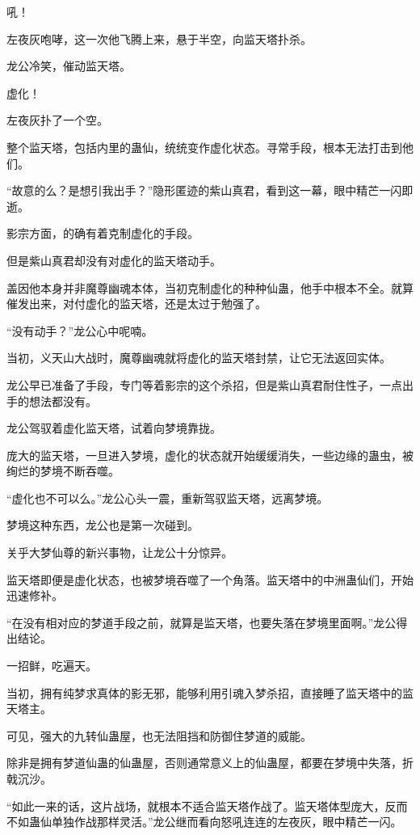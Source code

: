 
\begin{this_body}

吼！

左夜灰咆哮，这一次他飞腾上来，悬于半空，向监天塔扑杀。

龙公冷笑，催动监天塔。

虚化！

左夜灰扑了一个空。

整个监天塔，包括内里的蛊仙，统统变作虚化状态。寻常手段，根本无法打击到他们。

“故意的么？是想引我出手？”隐形匿迹的紫山真君，看到这一幕，眼中精芒一闪即逝。

影宗方面，的确有着克制虚化的手段。

但是紫山真君却没有对虚化的监天塔动手。

盖因他本身并非魔尊幽魂本体，当初克制虚化的种种仙蛊，他手中根本不全。就算催发出来，对付虚化的监天塔，还是太过于勉强了。

“没有动手？”龙公心中呢喃。

当初，义天山大战时，魔尊幽魂就将虚化的监天塔封禁，让它无法返回实体。

龙公早已准备了手段，专门等着影宗的这个杀招，但是紫山真君耐住性子，一点出手的想法都没有。

龙公驾驭着虚化监天塔，试着向梦境靠拢。

庞大的监天塔，一旦进入梦境，虚化的状态就开始缓缓消失，一些边缘的蛊虫，被绚烂的梦境不断吞噬。

“虚化也不可以么。”龙公心头一震，重新驾驭监天塔，远离梦境。

梦境这种东西，龙公也是第一次碰到。

关乎大梦仙尊的新兴事物，让龙公十分惊异。

监天塔即便是虚化状态，也被梦境吞噬了一个角落。监天塔中的中洲蛊仙们，开始迅速修补。

“在没有相对应的梦道手段之前，就算是监天塔，也要失落在梦境里面啊。”龙公得出结论。

一招鲜，吃遍天。

当初，拥有纯梦求真体的影无邪，能够利用引魂入梦杀招，直接睡了监天塔中的监天塔主。

可见，强大的九转仙蛊屋，也无法阻挡和防御住梦道的威能。

除非是拥有梦道仙蛊的仙蛊屋，否则通常意义上的仙蛊屋，都要在梦境中失落，折戟沉沙。

“如此一来的话，这片战场，就根本不适合监天塔作战了。监天塔体型庞大，反而不如蛊仙单独作战那样灵活。”龙公继而看向怒吼连连的左夜灰，眼中精芒一闪。


\end{this_body}
